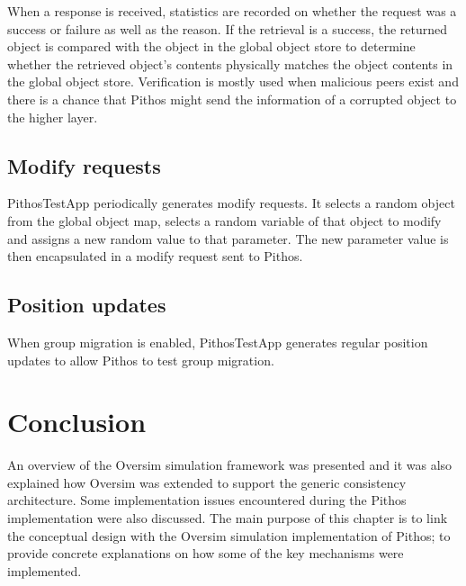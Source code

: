 When a response is received, statistics are recorded on whether the request was a success or failure as well as the reason. If the retrieval is a success, the returned object is compared with the object in the global object store to determine whether the retrieved object's contents physically matches the object contents in the global object store. Verification is mostly used when malicious peers exist and there is a chance that Pithos might send the information of a corrupted object to the higher layer.

\subsection{Modify requests}

PithosTestApp periodically generates modify requests. It selects a random object from the global object map, selects a random variable of that object to modify and assigns a new random value to that parameter. The new parameter value is then encapsulated in a modify request sent to Pithos.

\subsection{Position updates}

When group migration is enabled, PithosTestApp generates regular position updates to allow Pithos to test group migration.

\section{Conclusion}

An overview of the Oversim simulation framework was presented and it was also explained how Oversim was extended to support the generic consistency architecture. Some implementation issues encountered during the Pithos implementation were also discussed. The main purpose of this chapter is to link the conceptual design with the Oversim simulation implementation of Pithos; to provide concrete explanations on how some of the key mechanisms were implemented.
